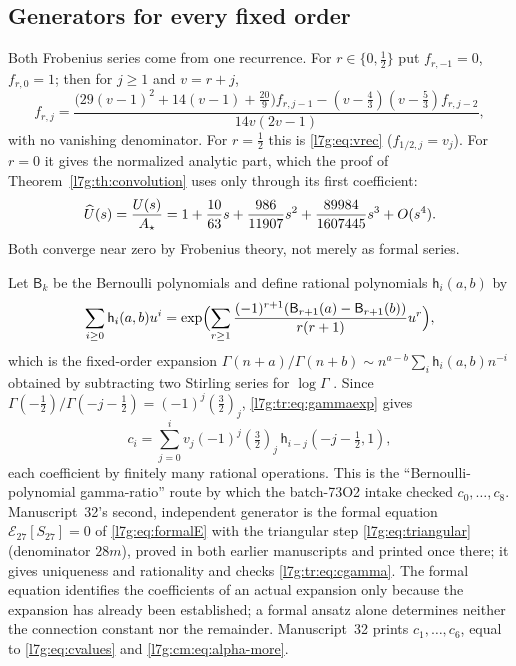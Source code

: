 \documentclass[11pt,letterpaper]{article}
\theoremstyle{remark}\newtheorem{remark}[theorem]{Remark}
\newcounter{l7gtrsavedeq}
\begin{document}
\subsection{Generators for every fixed order}\label{l7g:tr:sec:generators}
Both Frobenius series come from one recurrence. For $r\in\{0,\frac12\}$ put
$f_{r,-1}=0$, $f_{r,0}=1$; then for $j\ge1$ and $v=r+j$,
\begin{equation}\label{l7g:tr:eq:frob}
 f_{r,j}=\frac{\bigl(29(v-1)^2+14(v-1)+\frac{20}9\bigr)f_{r,j-1}
 -(v-\frac43)(v-\frac53)f_{r,j-2}}{14v(2v-1)},
\end{equation}
with no vanishing denominator. For $r=\frac12$ this is \eqref{l7g:eq:vrec}
($f_{1/2,j}=v_j$). For $r=0$ it gives the normalized analytic part, which
the proof of Theorem~\ref{l7g:th:convolution} uses only through its first
coefficient:
\begin{equation}\label{l7g:tr:eq:Uhat}
 \widehat U(s)=\frac{U(s)}{A_\star}=1+\frac{10}{63}s+\frac{986}{11907}s^2
 +\frac{89984}{1607445}s^3+O(s^4).
\end{equation}
Both converge near zero by Frobenius theory, not merely as formal series.

Let $\mathsf B_k$ be the Bernoulli polynomials and define rational
polynomials $\mathsf h_i(a,b)$ by
\begin{equation}\label{l7g:tr:eq:gammaratio}
 \sum_{i\ge0}\mathsf h_i(a,b)u^i=\exp\Bigl(\sum_{r\ge1}
 \frac{(-1)^{r+1}(\mathsf B_{r+1}(a)-\mathsf B_{r+1}(b))}{r(r+1)}u^r\Bigr),
\end{equation}
which is the fixed-order expansion
$\Gamma(n+a)/\Gamma(n+b)\sim n^{a-b}\sum_i\mathsf h_i(a,b)n^{-i}$ obtained by
subtracting two Stirling series for $\log\Gamma$
\cite[\S5.11]{l7g:dlmf}. Since $\Gamma(-\frac12)/\Gamma(-j-\frac12)
=(-1)^j(\frac32)_j$, \eqref{l7g:tr:eq:gammaexp} gives
\begin{equation}\label{l7g:tr:eq:cgamma}
 c_i=\sum_{j=0}^{i}v_j(-1)^j(\tfrac32)_j\,\mathsf h_{i-j}(-j-\tfrac12,1),
\end{equation}
each coefficient by finitely many rational operations. This is the
``Bernoulli-polynomial gamma-ratio'' route by which the batch-73O2 intake
checked $c_0,\dots,c_8$. Manuscript~32's second, independent generator is
the formal equation $\mathcal E_{27}[S_{27}]=0$ of \eqref{l7g:eq:formalE}
with the triangular step \eqref{l7g:eq:triangular} (denominator $28m$),
proved in both earlier manuscripts and printed once there; it gives
uniqueness and rationality and checks \eqref{l7g:tr:eq:cgamma}. The formal
equation identifies the coefficients of an actual expansion only because
the expansion has already been established; a formal ansatz alone
determines neither the connection constant nor the remainder. Manuscript~32
prints $c_1,\dots,c_6$, equal to \eqref{l7g:eq:cvalues} and
\eqref{l7g:cm:eq:alpha-more}.
\end{document}

